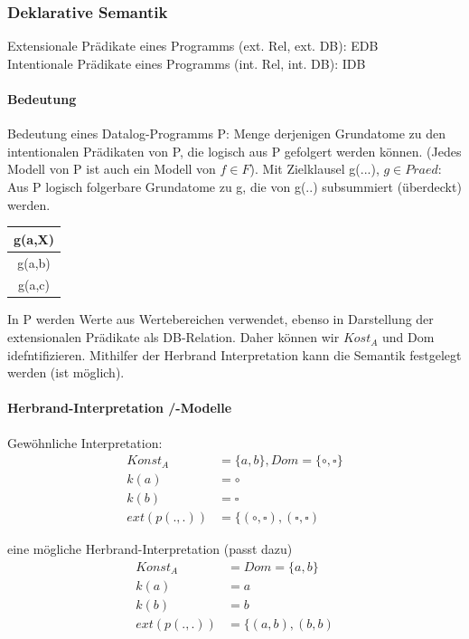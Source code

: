\documentclass[12pt, a4paper]{article}
\begin{document}
\subsubsection*{Deklarative Semantik}
Extensionale Prädikate eines Programms (ext. Rel, ext. DB): EDB\\
Intentionale Prädikate eines Programms (int. Rel, int. DB): IDB\\

\paragraph*{Bedeutung}
Bedeutung eines Datalog-Programms P: Menge derjenigen Grundatome zu den intentionalen Prädikaten von P, die logisch aus P gefolgert werden können. (Jedes Modell von P ist auch ein Modell von $f \in F$). Mit Zielklausel g(...), $g \in Praed$: Aus P logisch folgerbare Grundatome zu g, die von g(..) subsummiert (überdeckt) werden.
\begin{tabular}{c}
g(a,X) \\ \hline
g(a,b) \\
g(a,c)
\end{tabular}

In P werden Werte aus Wertebereichen verwendet, ebenso in Darstellung der extensionalen Prädikate als DB-Relation. Daher können wir $Kost_A$ und Dom idefntifizieren. Mithilfer der Herbrand Interpretation kann die Semantik festgelegt werden (ist möglich).


\paragraph*{Herbrand-Interpretation /-Modelle}

Gewöhnliche Interpretation: \\
\begin{equation}
\begin{split}
Konst_A &= \{ a,b \}, Dom = \{ \circ, \square \} \\
k(a) &= \circ\\
k(b) &= \square \\
ext(p(.,.)) &=  \{ (\circ, \square), (\square, \square) 
\end{split}
\end{equation}

eine mögliche Herbrand-Interpretation (passt dazu)
\begin{equation}
\begin{split}
Konst_A &= Dom = \{ a,b \} \\
k(a) &= a\\
k(b) &= b \\
ext(p(.,.)) &=  \{ (a, b), (b, b) 
\end{split}
\end{equation}
\end{document}

